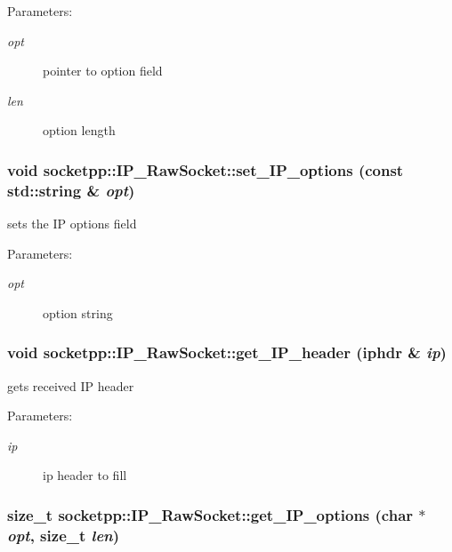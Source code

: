 \begin{Desc}
\item[Parameters:]
\begin{description}
\item[{\em opt}]pointer to option field \item[{\em len}]option length \end{description}
\end{Desc}
\hypertarget{classsocketpp_1_1IP__RawSocket_9d88ecec5e362b3cf3d3dbc51d5dd0cd}{
\subsubsection{\setlength{\rightskip}{0pt plus 5cm}void socketpp::IP\_\-RawSocket::set\_\-IP\_\-options (const std::string \& {\em opt})}}
\label{classsocketpp_1_1IP__RawSocket_9d88ecec5e362b3cf3d3dbc51d5dd0cd}


sets the IP options field 

\begin{Desc}
\item[Parameters:]
\begin{description}
\item[{\em opt}]option string \end{description}
\end{Desc}
\hypertarget{classsocketpp_1_1IP__RawSocket_e477f483d5a8baa76c60399d0809d043}{
\subsubsection{\setlength{\rightskip}{0pt plus 5cm}void socketpp::IP\_\-RawSocket::get\_\-IP\_\-header (iphdr \& {\em ip})}}
\label{classsocketpp_1_1IP__RawSocket_e477f483d5a8baa76c60399d0809d043}


gets received IP header 

\begin{Desc}
\item[Parameters:]
\begin{description}
\item[{\em ip}]ip header to fill \end{description}
\end{Desc}
\hypertarget{classsocketpp_1_1IP__RawSocket_686fcc72997b0843b2ece0c4d8a5735d}{
\subsubsection{\setlength{\rightskip}{0pt plus 5cm}size\_\-t socketpp::IP\_\-RawSocket::get\_\-IP\_\-options (char $\ast$ {\em opt}, \/  size\_\-t {\em len})}}
\label{classsocketpp_1_1IP__RawSocket_686fcc72997b0843b2ece0c4d8a5735d}



